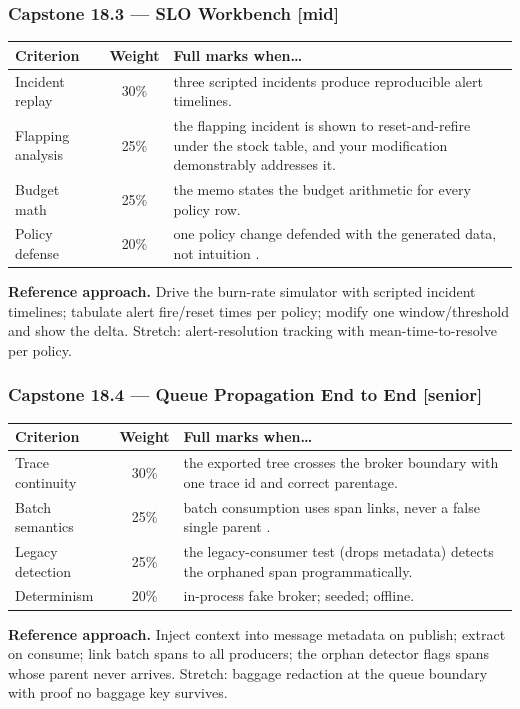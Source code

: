 \subsubsection*{Capstone 18.3 --- SLO Workbench [mid]}
\begin{center}\small
\begin{tabularx}{\textwidth}{l c X}
\toprule
\textbf{Criterion} & \textbf{Weight} & \textbf{Full marks when\ldots} \\
\midrule
Incident replay & 30\% & three scripted incidents produce reproducible alert timelines. \\
Flapping analysis & 25\% & the flapping incident is shown to reset-and-refire under the stock table, and your modification demonstrably addresses it. \\
Budget math & 25\% & the memo states the budget arithmetic for every policy row. \\
Policy defense & 20\% & one policy change defended with the generated data, not intuition \cite{beyer2016sre}. \\
\bottomrule
\end{tabularx}
\end{center}
\textbf{Reference approach.} Drive the burn-rate simulator with scripted
incident timelines; tabulate alert fire/reset times per policy; modify one
window/threshold and show the delta. Stretch: alert-resolution tracking
with mean-time-to-resolve per policy.

\subsubsection*{Capstone 18.4 --- Queue Propagation End to End [senior]}
\begin{center}\small
\begin{tabularx}{\textwidth}{l c X}
\toprule
\textbf{Criterion} & \textbf{Weight} & \textbf{Full marks when\ldots} \\
\midrule
Trace continuity & 30\% & the exported tree crosses the broker boundary with one trace id and correct parentage. \\
Batch semantics & 25\% & batch consumption uses span links, never a false single parent \cite{opentelemetrydocs}. \\
Legacy detection & 25\% & the legacy-consumer test (drops metadata) detects the orphaned span programmatically. \\
Determinism & 20\% & in-process fake broker; seeded; offline. \\
\bottomrule
\end{tabularx}
\end{center}
\textbf{Reference approach.} Inject context into message metadata on
publish; extract on consume; link batch spans to all producers; the orphan
detector flags spans whose parent never arrives. Stretch: baggage redaction
at the queue boundary with proof no baggage key survives.

